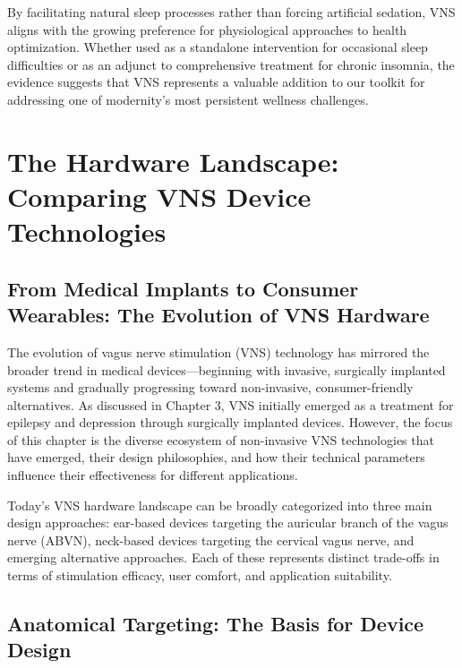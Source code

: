 \documentclass[
  Letterpaper,
]{scrbook}
\begin{document}
By facilitating natural sleep processes rather than forcing artificial
sedation, VNS aligns with the growing preference for physiological
approaches to health optimization. Whether used as a standalone
intervention for occasional sleep difficulties or as an adjunct to
comprehensive treatment for chronic insomnia, the evidence suggests that
VNS represents a valuable addition to our toolkit for addressing one of
modernity's most persistent wellness challenges.


\chapter{The Hardware Landscape: Comparing VNS Device
Technologies}\label{the-hardware-landscape-comparing-vns-device-technologies}

\section{From Medical Implants to Consumer Wearables: The Evolution of
VNS
Hardware}\label{from-medical-implants-to-consumer-wearables-the-evolution-of-vns-hardware}

The evolution of vagus nerve stimulation (VNS) technology has mirrored
the broader trend in medical devices---beginning with invasive,
surgically implanted systems and gradually progressing toward
non-invasive, consumer-friendly alternatives. As discussed in Chapter 3,
VNS initially emerged as a treatment for epilepsy and depression through
surgically implanted devices. However, the focus of this chapter is the
diverse ecosystem of non-invasive VNS technologies that have emerged,
their design philosophies, and how their technical parameters influence
their effectiveness for different applications.

Today's VNS hardware landscape can be broadly categorized into three
main design approaches: ear-based devices targeting the auricular branch
of the vagus nerve (ABVN), neck-based devices targeting the cervical
vagus nerve, and emerging alternative approaches. Each of these
represents distinct trade-offs in terms of stimulation efficacy, user
comfort, and application suitability.

\section{Anatomical Targeting: The Basis for Device
Design}\label{anatomical-targeting-the-basis-for-device-design}
\end{document}
